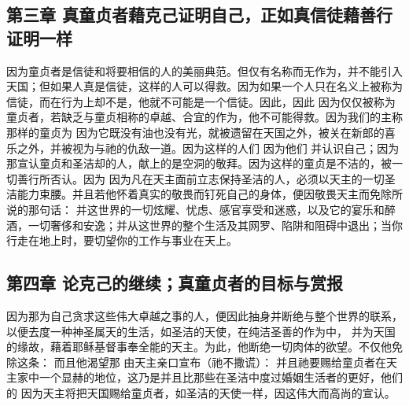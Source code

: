 
\subsection{第三章 真童贞者藉克己证明自己，正如真信徒藉善行证明一样}

因为童贞者是信徒和将要相信的人的美丽典范。但仅有名称而无作为，并不能引入天国；但如果人真是信徒，这样的人可以得救。因为如果一个人只在名义上被称为信徒，而在行为上却不是，他就不可能是一个信徒。因此，因此 因为仅仅被称为童贞者，若缺乏与童贞相称的卓越、合宜的作为，他不可能得救。因为我们的主称那样的童贞为 因为它既没有油也没有光，就被遗留在天国之外，被关在新郎的喜乐之外，并被视为与祂的仇敌一道。因为这样的人们 因为他们 并认识自己；因为那宣认童贞和圣洁却的人，献上的是空洞的敬拜。因为这样的童贞是不洁的，被一切善行所否认。因为  因为凡在天主面前立志保持圣洁的人，必须以天主的一切圣洁能力束腰。并且若他怀着真实的敬畏而钉死自己的身体，便因敬畏天主而免除所说的那句话： 并这世界的一切炫耀、忧虑、感官享受和迷惑，以及它的宴乐和醉酒，一切奢侈和安逸；并从这世界的整个生活及其网罗、陷阱和阻碍中退出；当你行走在地上时，要切望你的工作与事业在天上。\par


\subsection{第四章 论克己的继续；真童贞者的目标与赏报}

因为那为自己贪求这些伟大卓越之事的人，便因此抽身并断绝与整个世界的联系，以便去度一种神圣属天的生活，如圣洁的天使，在纯洁圣善的作为中， 并为天国的缘故，藉着耶稣基督事奉全能的天主。为此，他断绝一切肉体的欲望。不仅他免除这条： 而且他渴望那 由天主亲口宣布（祂不撒谎）： 并且祂要赐给童贞者在天主家中一个显赫的地位，这乃是并且比那些在圣洁中度过婚姻生活者的更好，他们的 因为天主将把天国赐给童贞者，如圣洁的天使一样，因这伟大而高尚的宣认。\par


